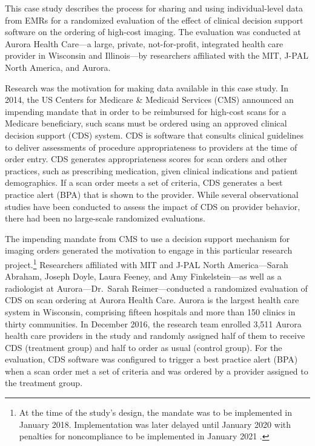 This case study describes the process for sharing and using individual-level data from EMRs for a randomized evaluation of the effect of clinical decision support software on the ordering of high-cost imaging. The evaluation was conducted at Aurora Health Care---a large, private, not-for-profit, integrated health care provider in Wisconsin and Illinois---by researchers affiliated with the MIT, J-PAL North America, and Aurora.

Research was the motivation for making data available in this case study. In 2014, the US Centers for Medicare \& Medicaid Services (CMS) announced an impending mandate that in order to be reimbursed for high-cost scans for a Medicare beneficiary, such scans must be ordered using an approved clinical decision support (CDS) system. CDS is software that consults clinical guidelines to deliver assessments of procedure appropriateness to providers at the time of order entry. CDS generates appropriateness scores for scan orders and other practices, such as prescribing medication, given clinical indications and patient demographics. If a scan order meets a set of criteria, CDS generates a best practice alert (BPA) that is shown to the provider. While several observational studies have been conducted to assess the impact of CDS on provider behavior, there had been no large-scale randomized evaluations.

The impending mandate from CMS to use a decision support mechanism for imaging orders generated the motivation to engage in this particular research project.\footnote{At the time of the study's design, the mandate was to be implemented in January 2018. Implementation was later delayed until January 2020 with penalties for noncompliance to be implemented in January 2021 \citep{hentel2019, centersformedicaremedicaidservices2018}.} Researchers affiliated with MIT and J-PAL North America---Sarah Abraham, Joseph Doyle, Laura Feeney, and Amy Finkelstein---as well as a radiologist at Aurora---Dr.~Sarah Reimer---conducted a randomized evaluation of CDS on scan ordering at Aurora Health Care. Aurora is the largest health care system in Wisconsin, comprising fifteen hospitals and more than 150 clinics in thirty communities. In December 2016, the research team enrolled 3,511 Aurora health care providers in the study and randomly assigned half of them to receive CDS (treatment group) and half to order as usual (control group). For the evaluation, CDS software was configured to trigger a best practice alert (BPA) when a scan order met a set of criteria and was ordered by a provider assigned to the treatment group.

